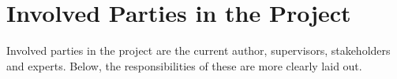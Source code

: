 \section{Involved Parties in the Project}

Involved parties in the project are the current author, supervisors, stakeholders and experts. Below, the responsibilities of these are more clearly laid out.


